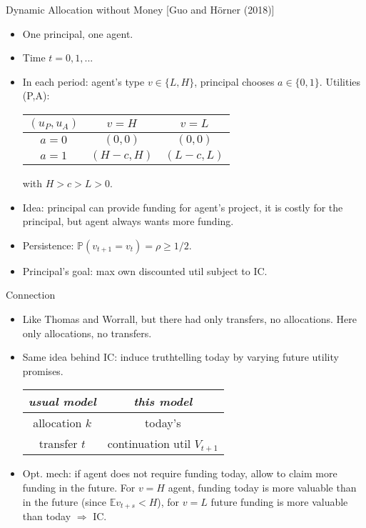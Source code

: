\documentclass[english,10pt
,aspectratio=169
]{beamer}
\begin{document}
\begin{frame}{Dynamic Allocation without Money [Guo and H{\"o}rner (2018)]}
\begin{itemize}
	\item One principal, one agent.
	\item Time $t=0,1,...$
	\item In each period: agent's type $v \in \{L,H\}$, principal chooses $a \in \{0,1\}$. Utilities (P,A):
	\medskip
	\begin{center}
		\begin{tabular}{c | c | c |}
			$(u_P,u_A)$ & $v = H$ 	& $v=L$ \\ \hline
			$a=0$	& $(0,0)$ 	& $(0,0)$	\\ \hline
			$a=1$	& $(H-c,H)$ 	& $(L-c,L)$	\\ \hline
		\end{tabular}
	\end{center}
	\medskip
	with $H > c > L > 0$.
	\item Idea: principal can provide funding for agent's project, it is costly for the principal, but agent always wants more funding.
	\item Persistence: $\mathbb{P}(v_{t+1} = v_t) = \rho \geq 1/2$.
	\item Principal's goal: max own discounted util subject to IC.
\end{itemize}
\end{frame}


\begin{frame}{Connection}
\begin{itemize}
	\item Like Thomas and Worrall, but there had only transfers, no allocations. Here only allocations, no transfers.
	\item Same idea behind IC: induce truthtelling today by varying future utility promises.
	\medskip
	\begin{center}
		\begin{tabular}{| c | c |}
			\hline
			\emph{usual model} 	& \emph{this model} \\ \hline
			allocation $k$ 	& today's \structure{allocation $a_t$}\\ \hline
			transfer $t$ 	& continuation util $V_{t+1}$\\ \hline
		\end{tabular}
	\end{center}
	\medskip
	\item Opt. mech: if agent does not require funding today, allow to claim more funding in the future. For $v=H$ agent, funding today is more valuable than in the future (since $\mathbb{E} v_{t+s} < H$), for $v=L$ future funding is more valuable than today $\Rightarrow$ IC.
\end{itemize}
\end{frame}
\end{document}
